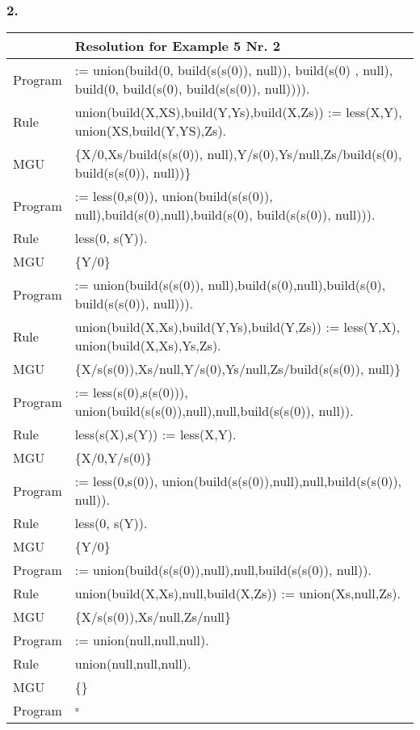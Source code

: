 \documentclass[10pt, a4paper]{article}
\begin{document}
\subsubsection{2.}

\begin{tabular}{L{1.5cm} | L{13.5cm}}

& Resolution for Example 5 Nr. 2 \\
\hline \hline
Program &
:= union(build(0, build(s(s(0)), null)), build(s(0) , null), build(0, build(s(0), build(s(s(0)), null)))).\\
\hline
Rule &
union(build(X,XS),build(Y,Ys),build(X,Zs)) := less(X,Y), union(XS,build(Y,YS),Zs).\\
\hline
MGU &
\{X/0,Xs/build(s(s(0)), null),Y/s(0),Ys/null,Zs/build(s(0), build(s(s(0)), null))\}\\
\hline\hline

Program &
:= less(0,s(0)), union(build(s(s(0)), null),build(s(0),null),build(s(0), build(s(s(0)), null))).\\
\hline
Rule &
less(0, s(Y)).\\
\hline
MGU &
\{Y/0\}\\
\hline\hline

Program &
:= union(build(s(s(0)), null),build(s(0),null),build(s(0), build(s(s(0)), null))).\\
\hline
Rule &
union(build(X,Xs),build(Y,Ys),build(Y,Zs)) := less(Y,X), union(build(X,Xs),Ys,Zs).\\
\hline
MGU &
\{X/s(s(0)),Xs/null,Y/s(0),Ys/null,Zs/build(s(s(0)), null)\}\\
\hline\hline

Program &
:= less(s(0),s(s(0))), union(build(s(s(0)),null),null,build(s(s(0)), null)).\\
\hline
Rule &
less(s(X),s(Y)) := less(X,Y).\\
\hline
MGU &
\{X/0,Y/s(0)\}\\
\hline\hline

Program &
:= less(0,s(0)), union(build(s(s(0)),null),null,build(s(s(0)), null)).\\
\hline
Rule &
less(0, s(Y)).\\
\hline
MGU &
\{Y/0\}\\
\hline\hline

Program &
:= union(build(s(s(0)),null),null,build(s(s(0)), null)).\\
\hline
Rule &
union(build(X,Xs),null,build(X,Zs)) := union(Xs,null,Zs).\\
\hline
MGU &
\{X/s(s(0)),Xs/null,Zs/null\}\\
\hline\hline

Program &
:= union(null,null,null).\\
\hline
Rule &
union(null,null,null).\\
\hline
MGU &
\{\}\\
\hline\hline

Program &
$\square$\\
\hline

\end{tabular}
\end{document}

